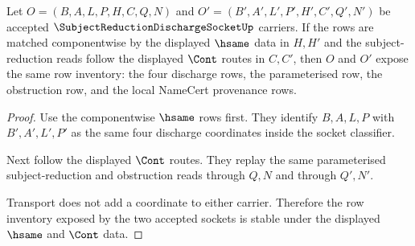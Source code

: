 \begin{theorem}
\label{thm:subject-reduction-discharge-socket-transport-stability}
Let $O=(B,A,L,P,H,C,Q,N)$ and $O'=(B',A',L',P',H',C',Q',N')$ be accepted $\SubjectReductionDischargeSocketUp$ carriers. If the rows are matched componentwise by the displayed $\hsame$ data in $H,H'$ and the subject-reduction reads follow the displayed $\Cont$ routes in $C,C'$, then $O$ and $O'$ expose the same row inventory: the four discharge rows, the parameterised row, the obstruction row, and the local NameCert provenance rows.
\end{theorem}
\begin{proof}
Use the componentwise $\hsame$ rows first. They identify $B,A,L,P$ with $B',A',L',P'$ as the same four discharge coordinates inside the socket classifier.

Next follow the displayed $\Cont$ routes. They replay the same parameterised subject-reduction and obstruction reads through $Q,N$ and through $Q',N'$.

Transport does not add a coordinate to either carrier. Therefore the row inventory exposed by the two accepted sockets is stable under the displayed $\hsame$ and $\Cont$ data.
\end{proof}

